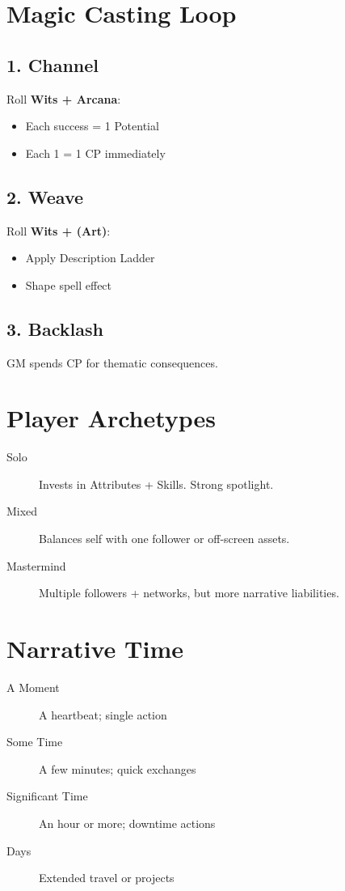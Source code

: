 \section{Magic Casting Loop}

\subsection*{1. Channel}
Roll \textbf{Wits + Arcana}:
\begin{itemize}
  \item Each success = 1 Potential
  \item Each 1 = 1 CP immediately
\end{itemize}

\subsection*{2. Weave}
Roll \textbf{Wits + (Art)}:
\begin{itemize}
  \item Apply Description Ladder
  \item Shape spell effect
\end{itemize}

\subsection*{3. Backlash}
GM spends CP for thematic consequences.

\section{Player Archetypes}

\begin{description}
  \item[Solo] Invests in Attributes + Skills. Strong spotlight.
  \item[Mixed] Balances self with one follower or off-screen assets.
  \item[Mastermind] Multiple followers + networks, but more narrative liabilities.
\end{description}

\section{Narrative Time}

\begin{description}
  \item[A Moment] A heartbeat; single action
  \item[Some Time] A few minutes; quick exchanges
  \item[Significant Time] An hour or more; downtime actions
  \item[Days] Extended travel or projects
\end{description}

